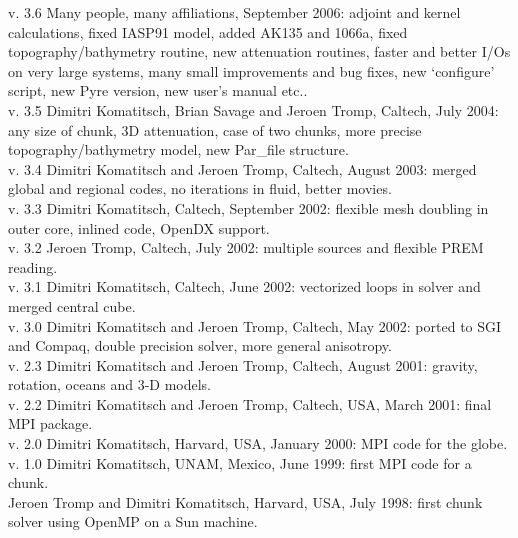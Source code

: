 \documentclass[oneside,english]{book}
\begin{document}
 v. 3.6 Many people, many affiliations, September 2006:
      adjoint and kernel calculations, fixed IASP91 model,
      added AK135 and 1066a, fixed topography/bathymetry routine,
      new attenuation routines, faster and better I/Os on very large
      systems, many small improvements and bug fixes, new `configure'
      script, new Pyre version, new user's manual etc..\\

 v. 3.5 Dimitri Komatitsch, Brian Savage and Jeroen Tromp, Caltech, July 2004:
      any size of chunk, 3D attenuation, case of two chunks,
      more precise topography/bathymetry model, new Par\_file structure.\\

 v. 3.4 Dimitri Komatitsch and Jeroen Tromp, Caltech, August 2003:
      merged global and regional codes, no iterations in fluid, better movies.\\

 v. 3.3 Dimitri Komatitsch, Caltech, September 2002:
      flexible mesh doubling in outer core, inlined code, OpenDX support.\\

 v. 3.2 Jeroen Tromp, Caltech, July 2002:
      multiple sources and flexible PREM reading.\\

 v. 3.1 Dimitri Komatitsch, Caltech, June 2002:
      vectorized loops in solver and merged central cube.\\

 v. 3.0 Dimitri Komatitsch and Jeroen Tromp, Caltech, May 2002:
   ported to SGI and Compaq, double precision solver, more general anisotropy.\\

 v. 2.3 Dimitri Komatitsch and Jeroen Tromp, Caltech, August 2001:
                       gravity, rotation, oceans and 3-D models.\\

 v. 2.2 Dimitri Komatitsch and Jeroen Tromp, Caltech, USA, March 2001:
                       final MPI package.\\

 v. 2.0 Dimitri Komatitsch, Harvard, USA, January 2000: MPI code for the globe.\\

 v. 1.0 Dimitri Komatitsch, UNAM, Mexico, June 1999: first MPI code for a chunk.\\

 Jeroen Tromp and Dimitri Komatitsch, Harvard, USA, July 1998: first chunk solver using OpenMP on a Sun machine.\\
\end{document}
